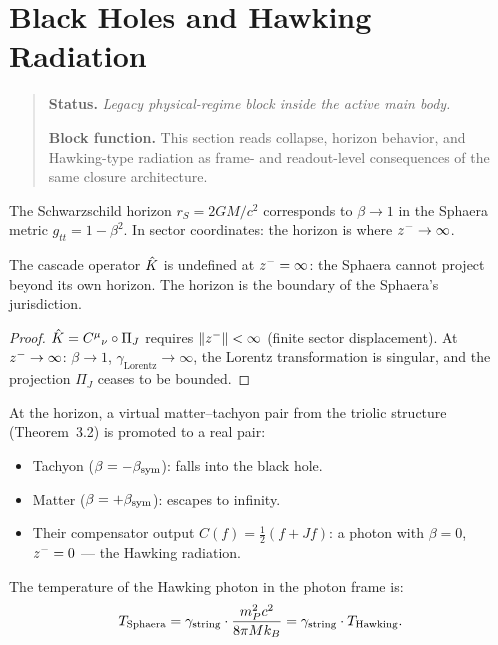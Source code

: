 
\section{Black Holes and Hawking Radiation}
\begin{quote}\small
\noindent\textbf{Status.} \emph{Legacy physical-regime block inside the active main body.}\par
\noindent\textbf{Block function.} This section reads collapse, horizon behavior, and Hawking-type radiation as frame- and readout-level consequences of the same closure architecture.
\end{quote}
\label{sec:bh}

\begin{definition}
The Schwarzschild horizon $r_S=2GM/c^2$ corresponds to $\beta\to 1$ in
the Sphaera metric $g_{tt}=1-\beta^2$.
In sector coordinates: the horizon is where $z^-\to\infty$.
\end{definition}

\begin{proposition}
\label{prop:horizon-cascade-singularity}
The cascade operator $\hat{K}$ is undefined at $z^-=\infty$: the Sphaera
cannot project beyond its own horizon.
The horizon is the boundary of the Sphaera's jurisdiction.
\begin{proof}
$\hat{K}=C^\mu{}_\nu\circ\Pi_J$ requires $\|z^-\|<\infty$
(finite sector displacement).
At $z^-\to\infty$: $\beta\to 1$, $\gamma_{\mathrm{Lorentz}}\to\infty$,
the Lorentz transformation is singular, and the projection $\Pi_J$ ceases
to be bounded.
\end{proof}
\end{proposition}

\begin{theorem}
\label{thm:hawking-triolic}
At the horizon, a virtual matter--tachyon pair from the triolic structure
(Theorem~3.2) is promoted to a real pair:
\begin{itemize}
 \item Tachyon ($\beta=-\beta_{\mathrm{sym}}$): falls into the black hole.
 \item Matter ($\beta=+\beta_{\mathrm{sym}}$): escapes to infinity.
 \item Their compensator output $C(f)=\tfrac{1}{2}(f+Jf)$: a photon
 with $\beta=0$, $z^-=0$ --- the Hawking radiation.
\end{itemize}
The temperature of the Hawking photon in the photon frame is:
\[
 T_{\mathrm{Sphaera}}
 = \gamma_{\mathrm{string}}\cdot\frac{m_P^2 c^2}{8\pi M k_B}
 = \gamma_{\mathrm{string}}\cdot T_{\mathrm{Hawking}}.
\]
\end{theorem}

